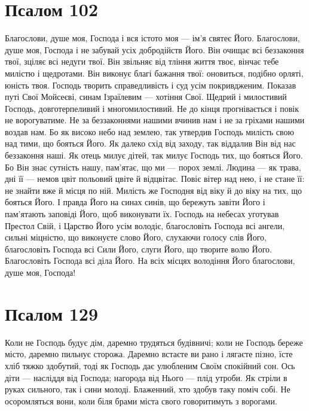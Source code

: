 \documentclass[chapters.tex]{subfiles}
\begin{document}
\section{Псалом 102}
Благослови, душе моя, Господа і вся істото моя — ім’я святеє Його. Благослови, душе моя, Господа і не забувай усіх добродійств Його. Він очищає всі беззаконня твої, зціляє всі недуги твої. Він звільняє від тління життя твоє, вінчає тебе милістю і щедротами. Він виконує благі бажання твої: оновиться, подібно орляті, юність твоя. Господь творить справедливість і суд усім покривдженим. Показав путі Свої Мойсеєві, синам Ізраїлевим — хотіння Свої. Щедрий і милостивий Господь, довготерпеливий і многомилостивий. Не до кінця прогнівається і повік не ворогуватиме. Не за беззаконнями нашими вчинив нам і не за гріхами нашими воздав нам. Бо як високо небо над землею, так утвердив Господь милість свою над тими, що бояться Його. Як далеко схід від заходу, так віддалив Він від нас беззаконня наші. Як отець милує дітей, так милує Господь тих, що бояться Його. Бо Він знає сутність нашу, пам’ятає, що ми — порох землі. Людина — як трава, дні її — немов цвіт польовий цвіте й відцвітає. Повіє вітер над нею, і не стане її: не знайти вже й місця по ній. Милість же Господня від віку й до віку на тих, що бояться Його. І правда Його на синах синів, що бережуть завіти Його і пам’ятають заповіді Його, щоб виконувати їх. Господь на небесах уготував Престол Свій, і Царство Його усім володіє, благословіть Господа всі ангели, сильні міцністю, що виконуєте слово Його, слухаючи голосу слів Його, благословіть Господа всі Сили Його, слуги Його, що творите волю Його. Благословіть Господа всі діла Його. На всіх місцях володіння Його благослови, душе моя, Господа!

\section{Псалом 129}
Коли не Господь будує дім, даремно трудяться будівничі; коли не Господь береже місто, даремно пильнує сторожа. Даремно встаєте ви рано і лягаєте пізно, їсте хліб тяжко здобутий, тоді як Господь дає улюбленим Своїм спокійний сон. Ось діти — насліддя від Господа; нагорода від Нього — плід утроби. Як стріли в руках сильного, так і сини молоді. Блаженний, хто здобув таку поміч собі. Не осоромляться вони, коли біля брами міста свого говоритимуть з ворогами.
\end{document}
